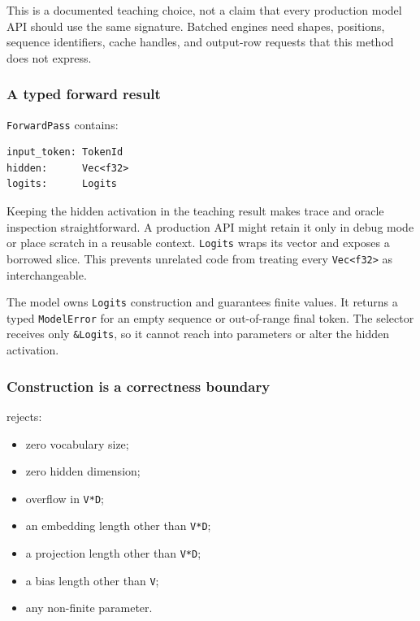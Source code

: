 \documentclass[
  10pt,
]{article}
\providecommand{\tightlist}{%
  \setlength{\itemsep}{0pt}\setlength{\parskip}{0pt}}
\begin{document}
This is a documented teaching choice, not a claim that every production
model API should use the same signature. Batched engines need shapes,
positions, sequence identifiers, cache handles, and output-row requests
that this method does not express.

\subsubsection{A typed forward result}\label{a-typed-forward-result}

\texttt{ForwardPass} contains:

\begin{verbatim}
input_token: TokenId
hidden:      Vec<f32>
logits:      Logits
\end{verbatim}

Keeping the hidden activation in the teaching result makes trace and
oracle inspection straightforward. A production API might retain it only
in debug mode or place scratch in a reusable context. \texttt{Logits}
wraps its vector and exposes a borrowed slice. This prevents unrelated
code from treating every \texttt{Vec\textless{}f32\textgreater{}} as
interchangeable.

The model owns \texttt{Logits} construction and guarantees finite
values. It returns a typed \texttt{ModelError} for an empty sequence or
out-of-range final token. The selector receives only \texttt{\&Logits},
so it cannot reach into parameters or alter the hidden activation.

\subsubsection{Construction is a correctness
boundary}\label{construction-is-a-correctness-boundary}

\texttt{} rejects:

\begin{itemize}
\tightlist
\item
  zero vocabulary size;
\item
  zero hidden dimension;
\item
  overflow in \texttt{V*D};
\item
  an embedding length other than \texttt{V*D};
\item
  a projection length other than \texttt{V*D};
\item
  a bias length other than \texttt{V};
\item
  any non-finite parameter.
\end{itemize}
\end{document}
